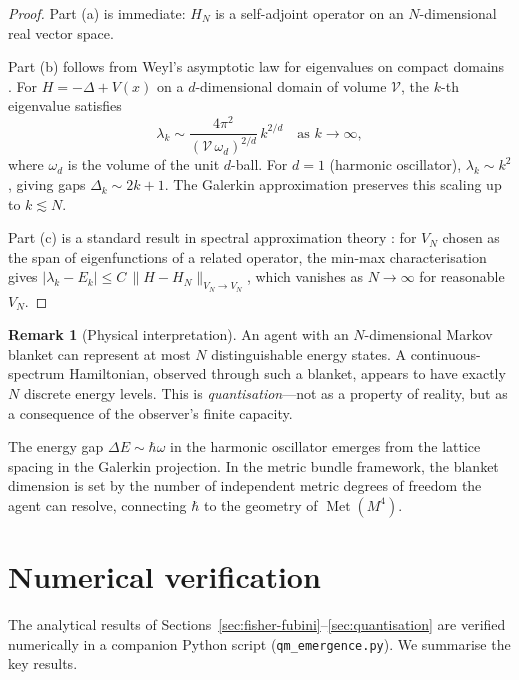 \documentclass[12pt,a4paper]{article}
\theoremstyle{definition}
\newtheorem{remark}[theorem]{Remark}
\newcommand{\Met}{\operatorname{Met}}
\begin{document}
\begin{proof}
Part (a) is immediate: $H_N$ is a self-adjoint operator on an
$N$-dimensional real vector space.

Part (b) follows from Weyl's asymptotic law for eigenvalues on compact
domains \cite{Weyl1911}. For $H = -\Delta + V(x)$ on a
$d$-dimensional domain of volume $\mathcal{V}$, the $k$-th eigenvalue
satisfies
\begin{equation}
  \lambda_k \sim \frac{4\pi^2}{(\mathcal{V}\,\omega_d)^{2/d}}\, k^{2/d}
  \quad \text{as } k \to \infty,
\end{equation}
where $\omega_d$ is the volume of the unit $d$-ball. For $d = 1$
(harmonic oscillator), $\lambda_k \sim k^2$, giving gaps
$\Delta_k \sim 2k + 1$. The Galerkin approximation preserves this
scaling up to $k \lesssim N$.

Part (c) is a standard result in spectral approximation theory
\cite{Chatelin2011,Boffi2010}: for $V_N$ chosen as the span of
eigenfunctions of a related operator, the min-max characterisation
gives
$|\lambda_k - E_k| \leq C\, \|H - H_N\|_{V_N \to V_N}$, which
vanishes as $N \to \infty$ for reasonable $V_N$.
\end{proof}

\begin{remark}[Physical interpretation]
An agent with an $N$-dimensional Markov blanket can represent at most
$N$ distinguishable energy states. A continuous-spectrum Hamiltonian,
observed through such a blanket, appears to have exactly $N$ discrete
energy levels. This is \emph{quantisation}---not as a property of
reality, but as a consequence of the observer's finite capacity.

The energy gap $\Delta E \sim \hbar\omega$ in the harmonic oscillator
emerges from the lattice spacing in the Galerkin projection. In
the metric bundle framework, the blanket dimension is set by the
number of independent metric degrees of freedom the agent can resolve,
connecting $\hbar$ to the geometry of $\Met(M^4)$.
\end{remark}

\section{Numerical verification}
\label{sec:numerics}

The analytical results of Sections~\ref{sec:fisher-fubini}--\ref{sec:quantisation}
are verified numerically in a companion Python script
(\texttt{qm\_emergence.py}). We summarise the key results.
\end{document}
